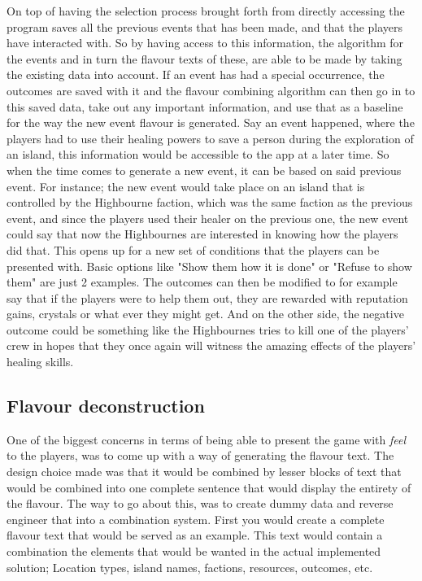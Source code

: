 On top of having the selection process brought forth from directly accessing the program saves all the previous events that has been made, and that the players have interacted with. So by having access to this information, the algorithm for the events and in turn the flavour texts of these, are able to be made by taking the existing data into account. If an event has had a special occurrence, the outcomes are saved with it and the flavour combining algorithm can then go in to this saved data, take out any important information, and use that as a baseline for the way the new event flavour is generated. Say an event happened, where the players had to use their healing powers to save a person during the exploration of an island, this information would be accessible to the app at a later time. So when the time comes to generate a new event, it can be based on said previous event. For instance; the new event would take place on an island that is controlled by the Highbourne faction, which was the same faction as the previous event, and since the players used their healer on the previous one, the new event could say that now the Highbournes are interested in knowing how the players did that. This opens up for a new set of conditions that the players can be presented with. Basic options like "Show them how it is done" or "Refuse to show them" are just 2 examples. The outcomes can then be modified to for example say that if the players were to help them out, they are rewarded with reputation gains, crystals or what ever they might get. And on the other side, the negative outcome could be something like the Highbournes tries to kill one of the players' crew in hopes that they once again will witness the amazing effects of the players' healing skills.

\subsection{Flavour deconstruction}
One of the biggest concerns in terms of being able to present the game with \textit{feel} to the players, was to come up with a way of generating the flavour text. The design choice made was that it would be combined by lesser blocks of text that would be combined into one complete sentence that would display the entirety of the flavour. The way to go about this, was to create dummy data and reverse engineer that into a combination system. First you would create a complete flavour text that would be served as an example. This text would contain a combination the elements that would be wanted in the actual implemented solution; Location types, island names, factions, resources, outcomes, etc.

